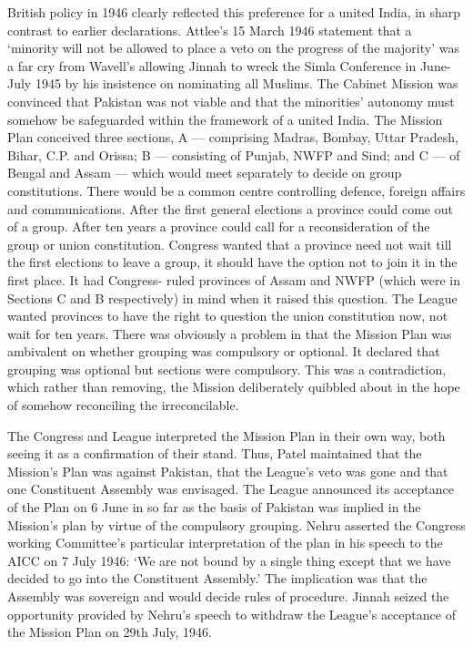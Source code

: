 British policy in 1946 clearly reflected this preference for a united India, in sharp contrast to earlier declarations. Attlee's 15 March 1946 statement that a `minority will not be allowed to place a veto on the progress of the majority' was a far cry from Wavell's allowing Jinnah to wreck the Simla Conference in June- July 1945 by his insistence on nominating all Muslims. The Cabinet Mission was convinced that Pakistan was not viable and that the minorities' autonomy must somehow be safeguarded within the framework of a united India. The Mission Plan conceived three sections, A — comprising Madras, Bombay, Uttar Pradesh, Bihar, C.P. and Orissa; B — consisting of Punjab, NWFP and Sind; and C — of Bengal and Assam — which would meet separately to decide on group constitutions. There would be a common centre controlling defence, foreign affairs and communications. After the first general elections a province could come out of a group. After ten years a province could call for a reconsideration of the group or union constitution. Congress wanted that a province need not wait till the first elections to leave a group, it should have the option not to join it in the first place. It had Congress- ruled provinces of Assam and NWFP (which were in Sections C and B respectively) in mind when it raised this question. The League wanted provinces to have the right to question the union constitution now, not wait for ten years. There was obviously a problem in that the Mission Plan was ambivalent on whether grouping was compulsory or optional. It declared that grouping was optional but sections were compulsory. This was a contradiction, which rather than removing, the Mission deliberately quibbled about in the hope of somehow reconciling the irreconcilable. 

The Congress and League interpreted the Mission Plan in their own way, both seeing it as a confirmation of their stand. Thus, Patel maintained that the Mission's Plan was against Pakistan, that the League's veto was gone and that one Constituent Assembly was envisaged. The League announced its acceptance of the Plan on 6 June in so far as the basis of Pakistan was implied in the Mission's plan by virtue of the compulsory grouping. Nehru asserted the Congress working Committee's particular interpretation of the plan in his speech to the AICC on 7 July 1946: `We are not bound by a single thing except that we have decided to go into the Constituent Assembly.' The implication was that the Assembly was sovereign and would decide rules of procedure. Jinnah seized the opportunity provided by Nehru's speech to withdraw the League's acceptance of the Mission Plan on 29th July, 1946. 

